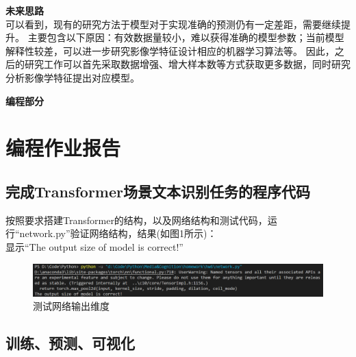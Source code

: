 \documentclass[a4paper]{article}
\begin{document}
\textbf{未来思路}\\
\hspace{2em}可以看到，现有的研究方法于模型对于实现准确的预测仍有一定差距，需要继续提升。
主要包含以下原因：有效数据量较小，难以获得准确的模型参数；当前模型解释性较差，可以进一步研究影像学特征设计相应的机器学习算法等。
因此，之后的研究工作可以首先采取数据增强、增大样本数等方式获取更多数据，同时研究分析影像学特征提出对应模型。\\

\vspace{3mm}
\centerline{\textbf{\Large{编程部分}}}
\vspace{3mm}
\section{编程作业报告}
\subsection{完成Transformer场景文本识别任务的程序代码}
按照要求搭建Transformer的结构，以及网络结构和测试代码，运行“network.py”验证网络结构，结果(如图1所示)：\\
显示“The output size of model is correct!”
\begin{figure}[H]
    \centering
    \includegraphics[width=12cm]{Fig_1.png}
    \caption{测试网络输出维度}
\end{figure}

\subsection{训练、预测、可视化}
\end{document}
